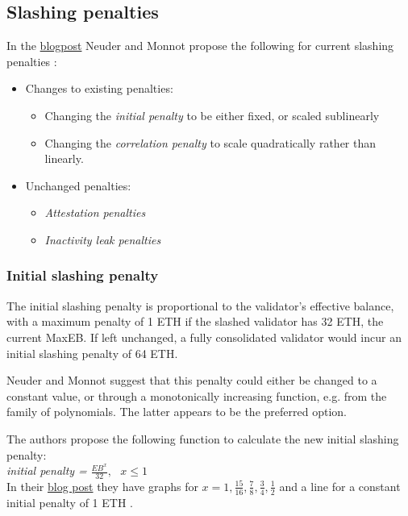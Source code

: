 
\subsection{Slashing penalties}
In the \href{https://notes.ethereum.org/@mikeneuder/slashings-eip-7251}{blogpost} Neuder and Monnot propose the following for current slashing penalties \cite{Neuder2023d}: 
\begin{itemize}
\item Changes to existing penalties:
	\begin{itemize}
	\item Changing the \textit{initial penalty} to be either fixed, or scaled sublinearly
	\item Changing the \textit{correlation penalty} to scale quadratically rather than linearly.
	\end{itemize}
\item Unchanged penalties:
	\begin{itemize}
	\item \textit{Attestation penalties}
	\item \textit{Inactivity leak penalties}
	\end{itemize}
\end{itemize}

\subsubsection*{Initial slashing penalty}
The initial slashing penalty is proportional to the validator's effective balance, with a maximum penalty of 1 ETH if the slashed validator has 32 ETH, the current MaxEB.
If left unchanged, a fully consolidated validator would incur an initial slashing penalty of 64 ETH.

Neuder and Monnot suggest that this penalty could either be changed to a constant value, or through a monotonically increasing function, e.g.  from the family of polynomials. The latter appears to be the preferred option. 

The authors propose the following function to calculate the new initial slashing penalty:\\
\textit{initial penalty =} $\frac{EB^x}{32}, \texttt{ } x \leqslant 1$ \\

In their \href{https://notes.ethereum.org/@mikeneuder/slashings-eip-7251}{blog post} they have graphs for $x=1, \frac{15}{16}, \frac{7}{8}, \frac{3}{4}, \frac{1}{2}$ and a line for a constant initial penalty of 1 ETH \cite{Neuder2023d}.

